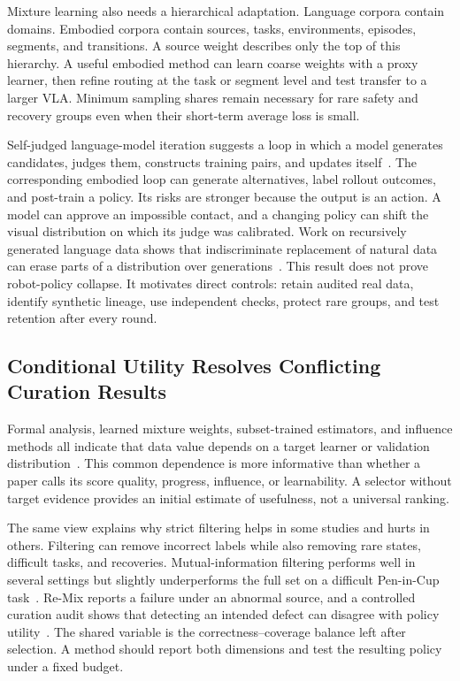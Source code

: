 Mixture learning also needs a hierarchical adaptation. Language corpora contain domains. Embodied corpora contain sources, tasks, environments, episodes, segments, and transitions. A source weight describes only the top of this hierarchy. A useful embodied method can learn coarse weights with a proxy learner, then refine routing at the task or segment level and test transfer to a larger VLA. Minimum sampling shares remain necessary for rare safety and recovery groups even when their short-term average loss is small.

Self-judged language-model iteration suggests a loop in which a model generates candidates, judges them, constructs training pairs, and updates itself~\cite{yuan2024self_2401_10020}. The corresponding embodied loop can generate alternatives, label rollout outcomes, and post-train a policy. Its risks are stronger because the output is an action. A model can approve an impossible contact, and a changing policy can shift the visual distribution on which its judge was calibrated. Work on recursively generated language data shows that indiscriminate replacement of natural data can erase parts of a distribution over generations~\cite{shumailov2024collapse}. This result does not prove robot-policy collapse. It motivates direct controls: retain audited real data, identify synthetic lineage, use independent checks, protect rare groups, and test retention after every round.

\subsection{Conditional Utility Resolves Conflicting Curation Results}

Formal analysis, learned mixture weights, subset-trained estimators, and influence methods all indicate that data value depends on a target learner or validation distribution~\cite{belkhale2023data_2306_02437,hejna2024re_2408_14037,dass2025datamil_2505_09603,lee2026quality_2603_09056}. This common dependence is more informative than whether a paper calls its score quality, progress, influence, or learnability. A selector without target evidence provides an initial estimate of usefulness, not a universal ranking.

The same view explains why strict filtering helps in some studies and hurts in others. Filtering can remove incorrect labels while also removing rare states, difficult tasks, and recoveries. Mutual-information filtering performs well in several settings but slightly underperforms the full set on a difficult Pen-in-Cup task~\cite{hejna2025robot_2502_08623}. Re-Mix reports a failure under an abnormal source, and a controlled curation audit shows that detecting an intended defect can disagree with policy utility~\cite{hejna2024re_2408_14037,bedi2026what_2606_10229}. The shared variable is the correctness--coverage balance left after selection. A method should report both dimensions and test the resulting policy under a fixed budget.

